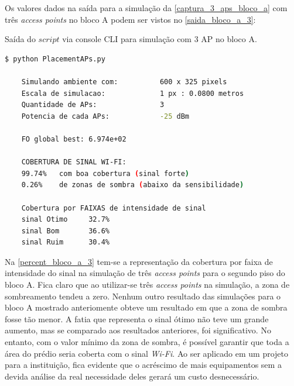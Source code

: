\documentclass[
	12pt,				%
	twoside,			%
	a4paper,			%
	english,			%
	french,				%
	spanish,			%
	brazil				%
	]{abntex2}
\begin{document}
Os valores dados na saída para a simulação da
\autoref{captura_3_aps_bloco_a} com três \emph{access points} no bloco A
podem ser vistos no \autoref{saida_bloco_a_3}:

\begin{quadro}[!htb]
    \caption{\label{saida_bloco_a_3} Saída do $script$ via console CLI para simulação com 3 AP no bloco A. }

    \begin{lstlisting}[language=bash]
    $ python PlacementAPs.py 

    Simulando ambiente com:          600 x 325 pixels
    Escala de simulacao:             1 px : 0.0800 metros
    Quantidade de APs:               3
    Potencia de cada APs:            -25 dBm

    FO global best: 6.974e+02

    COBERTURA DE SINAL WI-FI:
    99.74%   com boa cobertura (sinal forte)
    0.26%    de zonas de sombra (abaixo da sensibilidade)

    Cobertura por FAIXAS de intensidade de sinal
    sinal Otimo     32.7%
    sinal Bom       36.6%
    sinal Ruim      30.4%
    \end{lstlisting}

\end{quadro}

Na \autoref{percent_bloco_a_3} tem-se a representação da cobertura por
faixa de intensidade do sinal na simulação de três \emph{access points}
para o segundo piso do bloco A. Fica claro que ao utilizar-se três
\emph{access points} na simulação, a zona de sombreamento tendeu a zero.
Nenhum outro resultado das simulações para o bloco A mostrado
anteriomente obteve um resultado em que a zona de sombra fosse tão
menor. A fatia que representa o sinal ótimo não teve um grande aumento,
mas se comparado aos resultados anteriores, foi significativo. No
entanto, com o valor mínimo da zona de sombra, é possível garantir que
toda a área do prédio seria coberta com o sinal \emph{Wi-Fi}. Ao ser
aplicado em um projeto para a instituição, fica evidente que o acréscimo
de mais equipamentos sem a devida análise da real necessidade deles
gerará um custo desnecessário.
\end{document}
